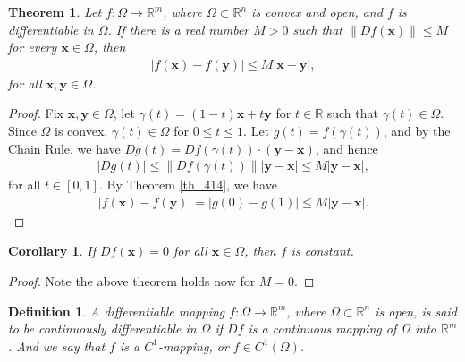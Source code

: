 \documentclass[10pt]{book}
\newtheorem{definition}{Definition}[chapter]
\newtheorem{theorem}{Theorem}[chapter]
\newtheorem{corollary}{Corollary}[theorem]
\theoremstyle{definition}
\numberwithin{equation}{chapter}
\begin{document}
\begin{theorem}\label{th_77}
Let $f: \Omega \to \mathbb{R}^m$, where $\Omega \subset \mathbb{R}^n$ is convex and open, and $f$ is differentiable in $\Omega$. If there is a real number $M > 0$ such that $\left\|Df(\mathbf{x})\right\| \leq M$ for every $\mathbf{x} \in \Omega$, then 
\begin{align*}
    \left|f(\mathbf{x}) - f(\mathbf{y})\right| \leq M \left|\mathbf{x} - \mathbf{y}\right|,
\end{align*}
for all $\mathbf{x}, \mathbf{y} \in \Omega$.
\end{theorem}
\begin{proof}
Fix $\mathbf{x}, \mathbf{y} \in \Omega$, let $\gamma(t) = (1 - t)\mathbf{x} + t\mathbf{y}$ for $t \in \mathbb{R}$ such that $\gamma(t) \in \Omega$. Since $\Omega$ is convex, $\gamma(t) \in \Omega$ for $0 \leq t \leq 1$. Let $g(t) = f(\gamma(t))$, and by the Chain Rule, we have $Dg(t) = Df(\gamma(t)) \cdot (\mathbf{y} - \mathbf{x})$, and hence
\begin{align*}
    \left|Dg(t)\right| \leq \left\|Df(\gamma(t))\right\| \left|\mathbf{y} - \mathbf{x}\right| \leq M \left|\mathbf{y} - \mathbf{x}\right|,
\end{align*}
for all $t \in [0,1]$. By Theorem \ref{th_414}, we have
\begin{align*}
    \left|f(\mathbf{x}) - f(\mathbf{y})\right| = \left|g(0) - g(1)\right| \leq M \left|\mathbf{y} - \mathbf{x}\right|.
\end{align*}
\end{proof}

\medskip

\begin{corollary}
If $Df(\mathbf{x}) = 0$ for all $\mathbf{x} \in \Omega$, then $f$ is constant.
\end{corollary}
\begin{proof}
Note the above theorem holds now for $M = 0$.
\end{proof}

\medskip

\begin{definition}
A differentiable mapping $f: \Omega \to \mathbb{R}^m$, where $\Omega \subset \mathbb{R}^n$ is open, is said to be continuously differentiable in $\Omega$ if $Df$ is a continuous mapping of $\Omega$ into $\mathbb{R}^m$. And we say that $f$ is a $C^1$-mapping, or $f \in C^1(\Omega)$.
\end{definition}

\medskip
\end{document}
